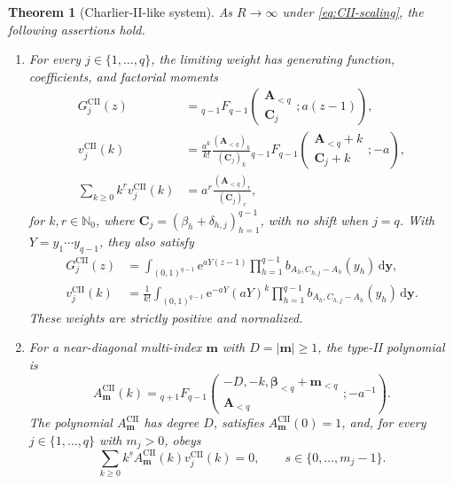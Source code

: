 \documentclass[10pt]{amsart}
\newcommand{\Nzero}{\mathbb N_0}
\newcommand{\e}{\mathrm e}
\newcommand{\dd}{\,\mathrm d}
\newcommand{\A}{\boldsymbol A}
\newcommand{\bbeta}{\boldsymbol\beta}
\newcommand{\mm}{\boldsymbol m}
\newcommand{\abs}[1]{\lvert#1\rvert}
\newcommand{\fall}[2]{#1^{\underline{#2}}}
\newcommand{\pFq}[5]{{}_{#1}F_{#2}\!\left(\begin{matrix}#3\\#4\end{matrix};#5\right)}
\theoremstyle{plain}
\newtheorem{theorem}{Theorem}[section]
\theoremstyle{definition}
\theoremstyle{remark}
\begin{document}
\begin{theorem}[Charlier-II-like system]
\label{thm:CII-system}
As \(R\to\infty\) under \eqref{eq:CII-scaling}, the following assertions hold.
\begin{enumerate}[label=\textnormal{(\roman*)}]
\item For every
\(j\in\{1,\ldots,q\}\), the limiting weight has generating function,
coefficients, and factorial moments
\begin{align}
 G_j^{\mathrm{CII}}(z)
 &=\pFq{q-1}{q-1}{\A_{<q}}{\boldsymbol C_j}{a(z-1)},
 \label{eq:CII-pgf}\\
 v_j^{\mathrm{CII}}(k)
 &=\frac{a^k}{k!}
 \frac{(\A_{<q})_k}{(\boldsymbol C_j)_k}
 \pFq{q-1}{q-1}{\A_{<q}+k}{\boldsymbol C_j+k}{-a},
 \label{eq:CII-mass}\\
 \sum_{k\ge0}\fall{k}{r}v_j^{\mathrm{CII}}(k)
 &=a^r\frac{(\A_{<q})_r}{(\boldsymbol C_j)_r},
 \label{eq:CII-moments}
\end{align}
for \(k,r\in\Nzero\), where
\(\boldsymbol C_j=(\beta_h+\delta_{h,j})_{h=1}^{q-1}\), with no shift
when \(j=q\). With \(Y=y_1\cdots y_{q-1}\), they also satisfy
\begin{align}
 G_j^{\mathrm{CII}}(z)
 &=\int_{(0,1)^{q-1}}\e^{aY(z-1)}
 \prod_{h=1}^{q-1}b_{A_h,C_{h,j}-A_h}(y_h)\dd\boldsymbol y,
 \label{eq:CII-Euler-integral}\\
 v_j^{\mathrm{CII}}(k)
 &=\frac1{k!}\int_{(0,1)^{q-1}}\e^{-aY}(aY)^k
 \prod_{h=1}^{q-1}b_{A_h,C_{h,j}-A_h}(y_h)\dd\boldsymbol y.
 \label{eq:CII-positive-coefficients}
\end{align}
These weights are strictly positive and normalized.

\item For a near-diagonal multi-index \(\mm\) with \(D=\abs\mm\ge1\),
the type-II polynomial is
\begin{equation}
 A_{\mm}^{\mathrm{CII}}(k)
 =\pFq{q+1}{q-1}
 {-D,-k,\bbeta_{<q}+\mm_{<q}}{\A_{<q}}{-a^{-1}}.
 \label{eq:CII-A}
\end{equation}
The polynomial \(A_{\mm}^{\mathrm{CII}}\) has degree \(D\), satisfies
\(A_{\mm}^{\mathrm{CII}}(0)=1\), and, for every
\(j\in\{1,\ldots,q\}\) with \(m_j>0\), obeys
\begin{equation}
 \sum_{k\ge0}\fall{k}{s}A_{\mm}^{\mathrm{CII}}(k)
 v_j^{\mathrm{CII}}(k)=0,
 \qquad s\in\{0,\ldots,m_j-1\}.
 \label{eq:CII-A-orthogonality}
\end{equation}


\end{enumerate}
\end{theorem}
\end{document}
